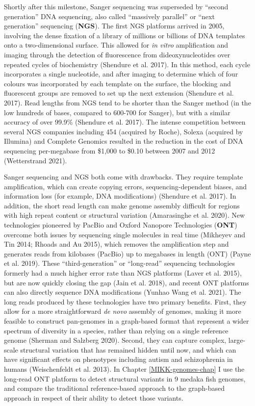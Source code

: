 \documentclass[
]{book}
\begin{document}
Shortly after this milestone, Sanger sequencing was superseded by ``second generation'' DNA sequencing, also called ``massively parallel'' or ``next generation'' sequencing (\textbf{NGS}). The first NGS platforms arrived in 2005, involving the dense fixation of a library of millions or billions of DNA templates onto a two-dimensional surface. This allowed for \emph{in vitro} amplification and imaging through the detection of fluorescence from dideoxynucleotides over repeated cycles of biochemistry (Shendure et al. 2017). In this method, each cycle incorporates a single nucleotide, and after imaging to determine which of four colours was incorporated by each template on the surface, the blocking and fluorescent groups are removed to set up the next extension (Shendure et al. 2017). Read lengths from NGS tend to be shorter than the Sanger method (in the low hundreds of bases, compared to 600-700 for Sanger), but with a similar accuracy of over 99.9\% (Shendure et al. 2017). The intense competition between several NGS companies including 454 (acquired by Roche), Solexa (acquired by Illumina) and Complete Genomics resulted in the reduction in the cost of DNA sequencing per-megabase from \$1,000 to \$0.10 between 2007 and 2012 (Wetterstrand 2021).

Sanger sequencing and NGS both come with drawbacks. They require template amplification, which can create copying errors, sequencing-dependent biases, and information loss (for example, DNA modifications) (Shendure et al. 2017). In addition, the short read length can make genome assembly difficult for regions with high repeat content or structural variation (Amarasinghe et al. 2020). New technologies pioneered by PacBio and Oxford Nanopore Technologies (\textbf{ONT}) overcome both issues by sequencing single molecules in real time (Mikheyev and Tin 2014; Rhoads and Au 2015), which removes the amplification step and generates reads from kilobases (PacBio) up to megabases in length (ONT) (Payne et al. 2019). These ``third-generation'' or ``long-read'' sequencing technologies formerly had a much higher error rate than NGS platforms (Laver et al. 2015), but are now quickly closing the gap (Jain et al. 2018), and recent ONT platforms can also directly sequence DNA modifications (Yunhao Wang et al. 2021). The long reads produced by these technologies have two primary benefits. First, they allow for a more straightforward \emph{de novo} assembly of genomes, making it more feasible to construct pan-genomes in a graph-based format that represent a wider spectrum of diversity in a species, rather than relying on a single reference genome (Sherman and Salzberg 2020). Second, they can capture complex, large-scale structural variation that has remained hidden until now, and which can have significant effects on phenotypes including autism and schizophrenia in humans (Weischenfeldt et al. 2013). In Chapter \ref{MIKK-genomes-chap} I use the long-read ONT platform to detect structural variants in 9 medaka fish genomes, and compare the traditional reference-based approach to the graph-based approach in respect of their ability to detect those variants.
\end{document}
